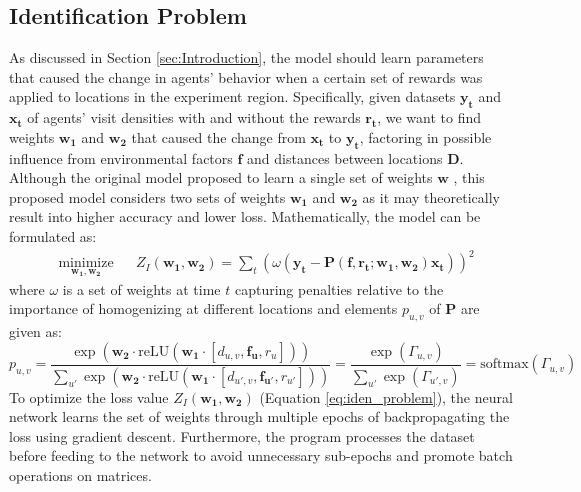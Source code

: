 \documentclass[12pt]{article}
\newcommand{\vect}[1]{\mathbf{#1}}  %
\newcommand{\matr}[1]{\mathbf{#1}}  %
\begin{document}
    \subsection{Identification Problem} \label{sec:Identification Problem}
    As discussed in Section \ref{sec:Introduction}, the model should learn parameters that caused the change in agents' behavior when a certain set of rewards was applied to locations in the experiment region. Specifically, given datasets $\vect{y_t}$ and $\vect{x_t}$ of agents' visit densities with and without the rewards $\vect{r_t}$, we want to find weights $\matr{w_1}$ and $\matr{w_2}$ that caused the change from $\vect{x_t}$ to $\vect{y_t}$, factoring in possible influence from environmental factors $\matr{f}$ and distances between locations $\matr{D}$. Although the original model proposed to learn a single set of weights $\matr{w}$ \cite{Xue2016Avi2}, this proposed model considers two sets of weights $\matr{w_1}$ and $\matr{w_2}$ as it may theoretically result into higher accuracy and lower loss. Mathematically, the model can be formulated as:
    \begin{equation} \label{eq:iden_problem}
        \begin{aligned}
            & \underset{\matr{w_1}, \matr{w_2}}{\text{minimize}}
            & & Z_I(\matr{w_1}, \matr{w_2}) = \sum_{t} (\omega(\vect{y_t} - \matr{P}(\matr{f}, \vect{r_t}; \matr{w_1}, \matr{w_2})\vect{x_t}))^{2}
        \end{aligned}
    \end{equation}
    where $\omega$ is a set of weights at time $t$ capturing penalties relative to the importance of homogenizing at different locations and elements $p_{u, v}$ of $\matr{P}$ are given as:
    \begin{equation} \label{eq:puv_equation}
    p_{u, v} = \frac{\exp(\matr{w_2} \cdot \text{reLU} (\matr{w_1} \cdot [d_{u, v}, \vect{f_{u}}, r_{u}]))}{\sum_{u'} \exp(\matr{w_2} \cdot \text{reLU} (\matr{w_1} \cdot [d_{u', v}, \vect{f_{u'}}, r_{u'}]))} = \frac{\exp(\Gamma_{u, v})}{\sum_{u'}\exp(\Gamma_{u', v})} = \text{softmax}(\Gamma_{u, v})
    \end{equation}
    To optimize the loss value $Z_I(\matr{w_1}, \matr{w_2})$ (Equation \ref{eq:iden_problem}), the neural network learns the set of weights through multiple epochs of backpropagating the loss using gradient descent. Furthermore, the program processes the dataset before feeding to the network to avoid unnecessary sub-epochs and promote batch operations on matrices. 
    
\end{document}
